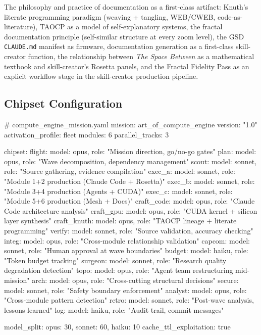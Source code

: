 \documentclass[11pt,letterpaper]{article}
\begin{document}
The philosophy and practice of documentation as a first-class artifact: Knuth's literate programming paradigm (weaving + tangling, WEB/CWEB, code-as-literature), TAOCP as a model of self-explanatory systems, the fractal documentation principle (self-similar structure at every zoom level), the GSD \texttt{CLAUDE.md} manifest as firmware, documentation generation as a first-class skill-creator function, the relationship between \textit{The Space Between} as a mathematical textbook and skill-creator's Rosetta panels, and the Fractal Fidelity Pass as an explicit workflow stage in the skill-creator production pipeline.

\subsection{Chipset Configuration}

\begin{asciibox}
# compute_engine_mission.yaml
mission: art_of_compute_engine
version: "1.0"
activation_profile: fleet
modules: 6
parallel_tracks: 3

chipset:
  flight:      { model: opus,   role: "Mission direction, go/no-go gates" }
  plan:        { model: opus,   role: "Wave decomposition, dependency management" }
  scout:       { model: sonnet, role: "Source gathering, evidence compilation" }
  exec_a:      { model: sonnet, role: "Module 1+2 production (Claude Code + Rosetta)" }
  exec_b:      { model: sonnet, role: "Module 3+4 production (Agents + CUDA)" }
  exec_c:      { model: sonnet, role: "Module 5+6 production (Mesh + Docs)" }
  craft_code:  { model: opus,   role: "Claude Code architecture analysis" }
  craft_gpu:   { model: opus,   role: "CUDA kernel + silicon layer synthesis" }
  craft_knuth: { model: opus,   role: "TAOCP lineage + literate programming" }
  verify:      { model: sonnet, role: "Source validation, accuracy checking" }
  integ:       { model: opus,   role: "Cross-module relationship validation" }
  capcom:      { model: sonnet, role: "Human approval at wave boundaries" }
  budget:      { model: haiku,  role: "Token budget tracking" }
  surgeon:     { model: sonnet, role: "Research quality degradation detection" }
  topo:        { model: opus,   role: "Agent team restructuring mid-mission" }
  arch:        { model: opus,   role: "Cross-cutting structural decisions" }
  secure:      { model: sonnet, role: "Safety boundary enforcement" }
  analyst:     { model: opus,   role: "Cross-module pattern detection" }
  retro:       { model: sonnet, role: "Post-wave analysis, lessons learned" }
  log:         { model: haiku,  role: "Audit trail, commit messages" }

model_split: { opus: 30, sonnet: 60, haiku: 10 }
cache_ttl_exploitation: true
\end{asciibox}
\end{document}
